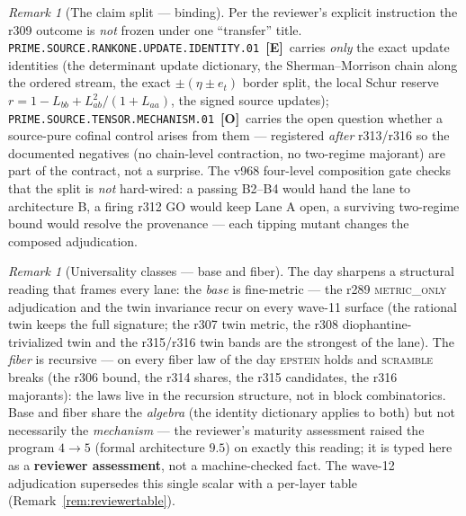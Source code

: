 \documentclass[11pt]{article}
\newcommand{\mE}{\textcolor{certgreen}{\textbf{[E]}}}
\newcommand{\mO}{\textcolor{openred}{\textbf{[O]}}}
\theoremstyle{definition}
\theoremstyle{remark}
\newtheorem{remark}[theorem]{Remark}
\begin{document}
\begin{remark}[The claim split --- binding]\label{rem:claimsplit}
Per the reviewer's explicit instruction the r309 outcome is
\emph{not} frozen under one ``transfer'' title.
\texttt{PRIME.SOURCE.RANKONE.UPDATE.IDENTITY.01}~\mE\ carries
\emph{only} the exact update identities (the determinant update
dictionary, the Sherman--Morrison chain along the ordered stream,
the exact $\pm(\eta \pm e_t)$ border split, the local Schur reserve
$r = 1 - L_{bb} + L_{ab}^2/(1 + L_{aa})$, the signed source
updates); \texttt{PRIME.SOURCE.TENSOR.MECHANISM.01}~\mO\ carries
the open question whether a source-pure cofinal control arises from
them --- registered \emph{after} r313/r316 so the documented
negatives (no chain-level contraction, no two-regime majorant) are
part of the contract, not a surprise.  The v968 four-level
composition gate checks that the split is \emph{not} hard-wired:
a passing B2--B4 would hand the lane to architecture B, a firing
r312 GO would keep Lane A open, a surviving two-regime bound would
resolve the provenance --- each tipping mutant changes the composed
adjudication.
\end{remark}

\begin{remark}[Universality classes --- base and fiber]
\label{rem:universality}
The day sharpens a structural reading that frames every lane: the
\emph{base} is fine-metric --- the r289 \textsc{metric\_only}
adjudication and the twin invariance recur on every wave-11 surface
(the rational twin keeps the full signature; the r307 twin metric,
the r308 diophantine-trivialized twin and the r315/r316 twin bands
are the strongest of the lane).  The \emph{fiber} is recursive ---
on every fiber law of the day \textsc{epstein} holds and
\textsc{scramble} breaks (the r306 bound, the r314 shares, the
r315 candidates, the r316 majorants): the laws live in the
recursion structure, not in block combinatorics.  Base and fiber
share the \emph{algebra} (the identity dictionary applies to both)
but not necessarily the \emph{mechanism} --- the reviewer's
maturity assessment raised the program $4 \to 5$ (formal
architecture $9.5$) on exactly this reading; it is typed here as a
\textbf{reviewer assessment}, not a machine-checked fact.  The
wave-12 adjudication supersedes this single scalar with a per-layer
table (Remark~\ref{rem:reviewertable}).
\end{remark}
\end{document}
